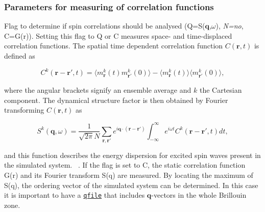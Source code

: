 \documentclass[11pt,fleqn,a4]{book} %
\makeatletter
\newcommand{\litem}[1]{\item[\bfseries#1\index{#1@\texttt{#1}}\label{#1}]}
\newcommand{\rkeyword}[1]{\hyperref[#1]{\texttt{#1}}}
\makeatother
\begin{document}
\subsubsection{Parameters for measuring of correlation functions \label{sqw}}
\begin{description}[leftmargin=!,labelwidth=\widthof{\bfseries fifteenchars}]
\litem{do_sc} Flag to determine if spin correlations should be analysed (Q=S($\mathbf{q}$,$\omega$), \emph{N=no}, C=G(r)). Setting this flag to Q or C measures space- and time-displaced correlation functions. The spatial time dependent correlation function $C(\mathbf{r},t)$ is defined as
\begin{declaration}
\begin{equation}
  C^k (\mathbf{r}-\mathbf{r'},t) = \langle m^k_{\mathbf{r}}(t) m^k_{\mathbf{r'}}(0) \rangle - \langle m^k_{\mathbf{r}}(t) \rangle \langle m^k_{\mathbf{r'}}(0) \rangle,
  \label{eqn:cf}
\end{equation}
\end{declaration}
\noindent where the angular brackets signify an ensemble average and $k$ the Cartesian component. The dynamical structure factor is then obtained by Fourier transforming $C(\mathbf{r},t)$ as
\begin{declaration}
\begin{equation}
  S^k(\mathbf{q},\omega) = \frac{1}{\sqrt{2\pi}N} \sum_{\mathbf{r},\mathbf{r'}} e^{i\mathbf{q}\cdot(\mathbf{r}-\mathbf{r'})} \int_{-\infty}^{\infty} e^{i\omega t} C^k (\mathbf{r}-\mathbf{r'},t) dt,
  \label{eqn:sf}
\end{equation}
\end{declaration}
and this function describes the energy dispersion for excited spin waves present in the simulated system.~\cite{Bergman2010} . If the flag is set to C, the static correlation function G(r) and its Fourier transform S(q) are measured. By locating the maximum of S(q), the ordering vector of the simulated system can be determined. In this case it is important to have a \rkeyword{qfile} that includes $\mathbf{q}$-vectors in the whole Brillouin zone. \\

\end{description}
\end{document}
